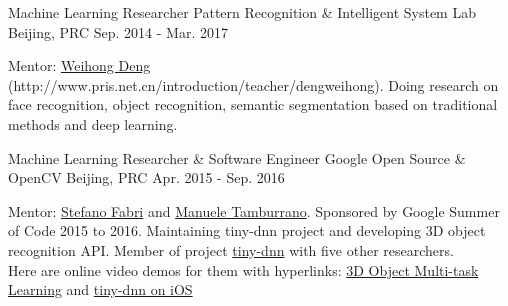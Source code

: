 


\begin{cventries}


\cventry
{Machine Learning Researcher} %
{Pattern Recognition \& Intelligent System Lab} %
{Beijing, PRC} %
{Sep. 2014 - Mar. 2017} %
{ %
\begin{cvitems}
\item {Mentor: \href{http://www.pris.net.cn/introduction/teacher/dengweihong}{Weihong Deng} (http://www.pris.net.cn/introduction/teacher/dengweihong). Doing research on face recognition, object recognition, semantic segmentation based on traditional methods and deep learning.}
\end{cvitems}
}

\cventry
{Machine Learning Researcher \& Software Engineer} %
{Google Open Source \& OpenCV} %
{Beijing, PRC} %
{Apr. 2015 - Sep. 2016} %
{ %
\begin{cvitems}
\item {Mentor: \href{https://www.linkedin.com/in/stefano-fabri-16a73748}{Stefano Fabri} and \href{https://www.linkedin.com/in/manuele-tamburrano-b82384a5?authType=name&authToken=Di5p&trk=prof-sb-browse_map-name}{Manuele Tamburrano}. Sponsored by Google Summer of Code 2015 to 2016. Maintaining tiny-dnn project and developing 3D object recognition API. Member of project \href{https://github.com/tiny-dnn/tiny-dnn}{tiny-dnn} with five other researchers. \\
Here are online video demos for them with hyperlinks: \href{https://www.youtube.com/watch?v=Mc20rTYdXTE}{3D Object Multi-task Learning} and \href{https://drive.google.com/open?id=0B-RYa1FDOrYXVUEzcG1mdnl5a3M}{tiny-dnn on iOS}
}
\end{cvitems}
}


\end{cventries}
